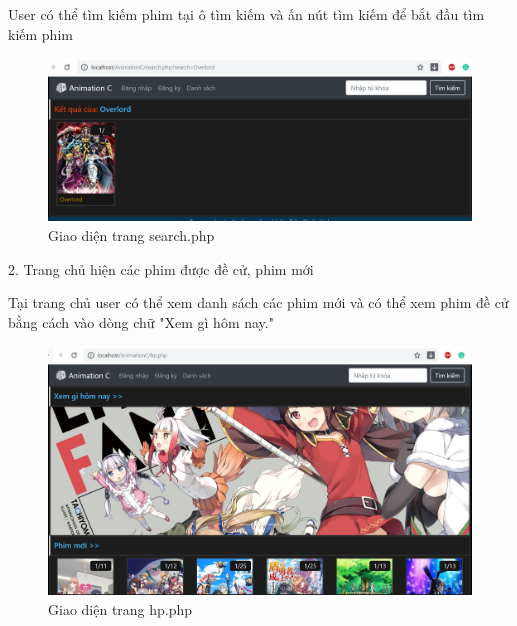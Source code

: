 \documentclass{report}
\begin{document}
User có thể tìm kiếm phim tại ô tìm kiếm và ấn nút tìm kiếm để bắt đầu tìm kiếm phim

\begin{center}
    \begin{figure}[htp]
    \begin{center}
     \includegraphics[scale=0.45]{2.png}
    \end{center}
    \caption{Giao diện trang search.php}
    \label{refhinh1}
    \end{figure}
\end{center}


\changefontsizes{14pt}
\setlength{\parindent}{0cm}
2. Trang chủ hiện các phim được đề cử, phim mới

\changefontsizes{13pt}
\setlength{\parindent}{1cm}
Tại trang chủ user có thể xem danh sách các phim mới và có thể xem phim đề cử bằng cách vào dòng chữ "Xem gì hôm nay."

\begin{center}
    \begin{figure}[htp]
    \begin{center}
     \includegraphics[scale=0.45]{3.png}
    \end{center}
    \caption{Giao diện trang hp.php}
    \label{refhinh1}
    \end{figure}
\end{center}
\end{document}
